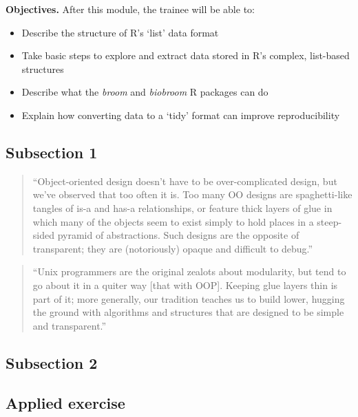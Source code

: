 \documentclass[]{tufte-book}
\providecommand{\tightlist}{%
  \setlength{\itemsep}{0pt}\setlength{\parskip}{0pt}}
\begin{document}
\textbf{Objectives.} After this module, the trainee will be able to:

\begin{itemize}
\tightlist
\item
  Describe the structure of R's `list' data format
\item
  Take basic steps to explore and extract data stored in R's complex, list-based
  structures
\item
  Describe what the \emph{broom} and \emph{biobroom} R packages can do
\item
  Explain how converting data to a `tidy' format can improve reproducibility
\end{itemize}

\hypertarget{subsection-1-11}{%
\subsection{Subsection 1}\label{subsection-1-11}}

\begin{quote}
``Object-oriented design doesn't have to be over-complicated design, but we've
observed that too often it is. Too many OO designs are spaghetti-like tangles of
is-a and has-a relationships, or feature thick layers of glue in which many of the
objects seem to exist simply to hold places in a steep-sided pyramid of abstractions.
Such designs are the opposite of transparent; they are (notoriously) opaque and
difficult to debug.'' \citep{raymond2003art}
\end{quote}

\begin{quote}
``Unix programmers are the original zealots about modularity, but tend to go about it
in a quiter way {[}that with OOP{]}. Keeping glue layers thin is part of it; more generally,
our tradition teaches us to build lower, hugging the ground with algorithms and structures
that are designed to be simple and transparent.'' \citep{raymond2003art}
\end{quote}

\hypertarget{subsection-2-10}{%
\subsection{Subsection 2}\label{subsection-2-10}}

\hypertarget{applied-exercise-5}{%
\subsection{Applied exercise}\label{applied-exercise-5}}
\end{document}
